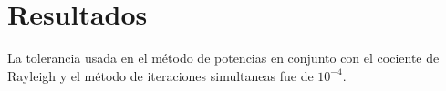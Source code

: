 \section{Resultados}

La tolerancia usada en el método de potencias en conjunto con el cociente de Rayleigh y el método de iteraciones simultaneas fue de $10^{-4}$.



